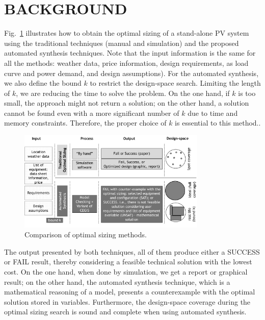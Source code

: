 \documentclass[runningheads]{llncs}
\begin{document}
\section{BACKGROUND}
\label{sec:AutomatedVerification}
Fig.~\ref{fig:optimization} illustrates how to obtain the optimal sizing of a stand-alone PV system using the traditional techniques (manual and simulation) and the proposed automated synthesis techniques. Note that the input information is the same for all the methods: weather data, price information, design requirements, as load curve and power demand, and design assumptions). For the automated synthesis, we also define the bound $k$ to restrict the design-space search. Limiting the length of $k$, we are reducing the time to solve the problem. On the one hand, if $k$ is too small, the approach might not return a solution; on the other hand, a solution cannot be found even with a more significant number of $k$ due to time and memory constraints. Therefore, the proper choice of $k$ is essential to this method.. 
%
\begin{figure}[h]
\includegraphics[width=0.8\textwidth]{optimalsizingprocess3}
\centering
\caption{Comparison of optimal sizing methods.}
\label{fig:optimization}
\end{figure}

The output presented by both techniques, all of them produce either a SUCCESS or FAIL result, thereby considering a feasible technical solution with the lowest cost. On the one hand, when done by simulation, we get a report or graphical result; on the other hand, the automated synthesis technique, which is a mathematical reasoning of a model, presents a counterexample with the optimal solution stored in variables. Furthermore, the design-space coverage during the optimal sizing search is sound and complete when using automated synthesis.
\end{document}
